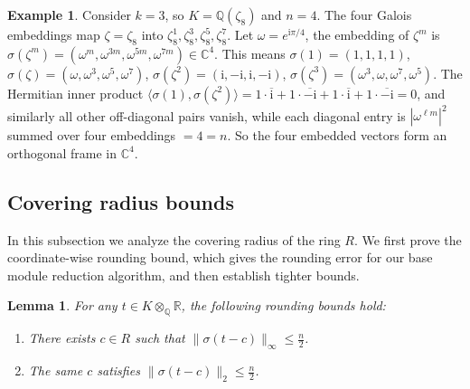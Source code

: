 \documentclass[11pt,a4paper]{article}
\theoremstyle{plain}
\newtheorem{lemma}[theorem]{Lemma}
\theoremstyle{definition}
\newtheorem{example}[theorem]{Example}
\theoremstyle{remark}
\newcommand{\Q}{\mathbb{Q}}
\newcommand{\R}{\mathbb{R}}
\newcommand{\C}{\mathbb{C}}
\begin{document}
\begin{example}
Consider $k=3$, so $K=\Q(\zeta_8)$ and $n=4$. The four Galois embeddings map $\zeta=\zeta_8$ into  $\zeta_8^1, \zeta_8^3, \zeta_8^5, \zeta_8^7$. Let $\omega=e^{\mathrm{i}\pi/4}$, the embedding of $\zeta^m$ is $\sigma(\zeta^m)=(\omega^m, \omega^{3m}, \omega^{5m}, \omega^{7m})\in\C^4$. This means $\sigma(1)=(1, 1, 1, 1)$, $\sigma(\zeta)=(\omega, \omega^3, \omega^5, \omega^7)$, $\sigma(\zeta^2)=(\mathrm{i}, -\mathrm{i}, \mathrm{i}, -\mathrm{i})$, $\sigma(\zeta^3)=(\omega^3, \omega, \omega^7, \omega^5)$. The Hermitian inner product $\langle\sigma(1), \sigma(\zeta^2)\rangle =1\cdot\overline{\mathrm{i}}+1\cdot\overline{-\mathrm{i}} +1\cdot\overline{\mathrm{i}}+1\cdot\overline{-\mathrm{i}} =0$, and similarly all other off-diagonal pairs vanish, while each diagonal entry is $|\omega^{\ell m}|^2$ summed over four embeddings $=4=n$. So the four embedded vectors form an orthogonal frame in $\C^4$.
\end{example}

\subsection{Covering radius bounds}\label{subsec:covering}

In this subsection we analyze the covering radius of the ring $R$. We first prove the coordinate-wise rounding bound, which gives the rounding error for our base module reduction algorithm, and then establish tighter bounds.

\begin{lemma}\label{lem:cover}
For any $t\in K\otimes_\Q\R$, the following rounding bounds hold:
\begin{enumerate}[label=(\roman*),nosep]
\item There exists $c\in R$ such that $\|\sigma(t-c)\|_\infty \le \frac{n}{2}$.
\item The same $c$ satisfies $\|\sigma(t-c)\|_2 \le \frac{n}{2}$.
\end{enumerate}
\end{lemma}
\end{document}
